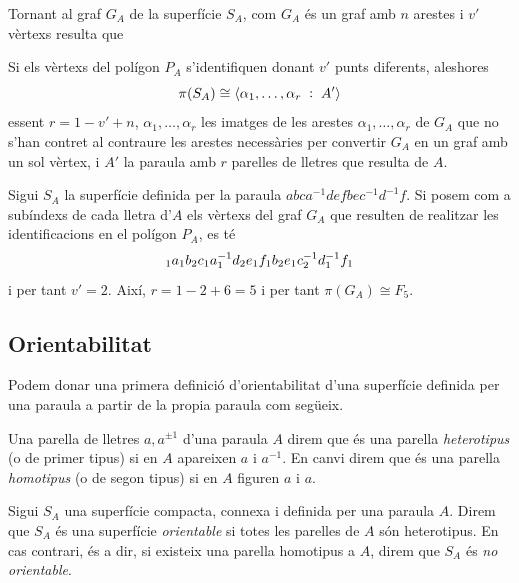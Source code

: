 \documentclass[../main.tex]{subfiles}
\begin{document}
Tornant al graf $G_A$ de la superfície $S_A$, com $G_A$ és un graf amb $n$ arestes i $v'$ vèrtexs resulta que
\begin{ter}
\label{ter:teoremagraf4} Si els vèrtexs del polígon $P_A$ s'identifiquen donant $v'$ punts diferents, aleshores
\begin{equation}
    \notag
    \pi(S_A)\cong\langle \alpha_1,\ldots,\alpha_r\;:\;A'\rangle
\end{equation}
essent $r = 1-v'+n$, $\alpha_1,\ldots,\alpha_r$ les imatges de les arestes $\alpha_1,\ldots,\alpha_r$ de $G_A$ que no s'han contret al contraure les arestes necessàries per convertir $G_A$ en un graf amb un sol vèrtex, i $A'$ la paraula amb $r$ parelles de lletres que resulta de $A$.
\end{ter}

\begin{ej}
Sigui $S_A$ la superfície definida per la paraula $abca^{-1}defbec^{-1}d^{-1}f$. Si posem com a subíndexs de cada lletra d'$A$ els vèrtexs del graf $G_A$ que resulten de realitzar les identificacions en el polígon $P_A$, es té
\begin{equation}
    \notag
    _1a_1b_2c_1a_1^{-1}d_2e_1f_1b_2e_1c^{-1}_2d^{-1}_1f_1
\end{equation}
i per tant $v'=2$. Així, $r = 1-2+6=5$ i per tant $\pi(G_A)\cong F_5$.
\end{ej}

\subsection{Orientabilitat}

Podem donar una primera definició d'orientabilitat d'una superfície definida per una paraula a partir de la propia paraula com següeix.

\begin{defi}
\label{def:heterotipus}\label{def:homotipus} Una parella de lletres $a,a^{\pm 1}$ d'una paraula $A$ direm que és una parella \textit{heterotipus} (o de primer tipus) si en $A$ apareixen $a$ i $a^{-1}$. En canvi direm que és una parella \textit{homotipus} (o de segon tipus) si en $A$ figuren $a$ i $a$.
\end{defi}

\begin{defi}
[Orientable]\label{def:orientable} Sigui $S_A$ una superfície compacta, connexa i definida per una paraula $A$. Direm que $S_A$ és una superfície \textit{orientable} si totes les parelles de $A$ són heterotipus. En cas contrari, és a dir, si existeix una parella homotipus a $A$, direm que $S_A$ és \textit{no orientable}.
\end{defi}
\end{document}
